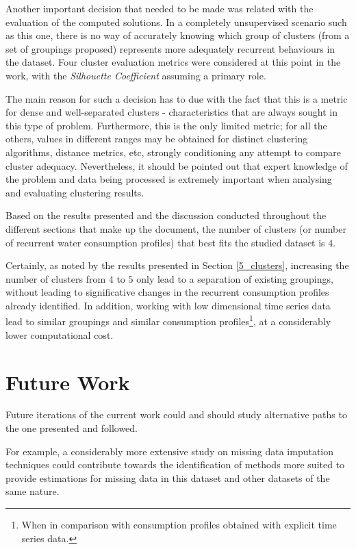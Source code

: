 \documentclass[9pt,journal,compsoc]{IEEEtran}
\begin{document}
Another important decision that needed to be made was related with the evaluation of the computed solutions. In a completely unsupervised scenario such as this one, there is no way of accurately knowing which group of clusters (from a set of groupings proposed) represents more adequately recurrent behaviours in the dataset. Four cluster evaluation metrics were considered at this point in the work, with the \emph{Silhouette Coefficient} assuming a primary role.

The main reason for such a decision has to due with the fact that this is a metric for dense and well-separated clusters - characteristics that are always sought in this type of problem. Furthermore, this is the only limited metric; for all the others, values in different ranges may be obtained for distinct clustering algorithms, distance metrics, etc, strongly conditioning any attempt to compare cluster adequacy. Nevertheless, it should be pointed out that expert knowledge of the problem and data being processed is extremely important when analysing and evaluating clustering results.

Based on the results presented and the discussion conducted throughout the different sections that make up the document, the number of clusters (or number of recurrent water consumption profiles) that best fits the studied dataset is $4$.

Certainly, as noted by the results presented in Section \ref{5_clusters}, increasing the number of clusters from $4$ to $5$ only lead to a separation of existing groupings, without leading to significative changes in the recurrent consumption profiles already identified. In addition, working with low dimensional time series data lead to similar groupings and similar consumption profiles\footnote{When in comparison with consumption profiles obtained with explicit time series data.}, at a considerably lower computational cost.

\section{Future Work}

Future iterations of the current work could and should study alternative paths to the one presented and followed.

For example, a considerably more extensive study on missing data imputation techniques could contribute towards the identification of methods more suited to provide estimations for missing data in this dataset and other datasets of the same nature.
\end{document}
